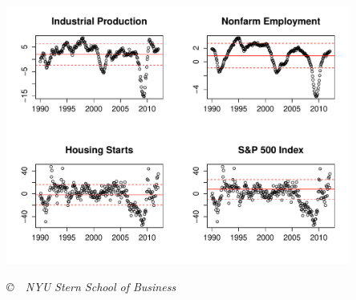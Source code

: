 \documentclass[12pt]{exam}
\begin{document}
\begin{questions}
\begin{solution}
\begin{center}
\includegraphics[width=0.85\textwidth]{ps3_q3_scorecard.pdf}
\end{center}

\end{solution}

\end{questions}

\vfill \centerline{\it \copyright \ \number\year \
NYU Stern School of Business}
\end{document}

